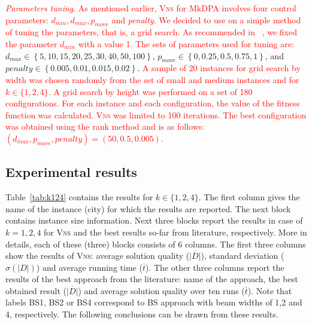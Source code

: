\documentclass[dvipsnames,format=sigconf]{acmart} %
\begin{document}
   \textcolor{red}{\emph{Parameters tuning}. As mentioned earlier, \textsc{Vns} for MkDPA involves four control parameters: $d_{min}, d_{max}, p_{move}$ and \emph{penalty}. We decided to use on a simple method of tuning the parameters, that is, a grid search. As recommended in  ~\cite{mladenovic1997variable}, we fixed the parameter $d_{min}$ with a value 1. The sets of parameters used for tuning are:}
  $d_{max}\in{\left\lbrace 5, 10, 15, 20, 25, 30, 40, 50, 100\right\rbrace }$,  $p_{move}\in{\left\lbrace 0, 0.25, 0.5, 0.75, 1\right\rbrace }$, and $penalty\in{\left\lbrace 0.005, 0.01, 0.015, 0.02\right\rbrace }$. \textcolor{red}{A sample of 20 instances for grid search by width was chosen randomly from the set of small and medium instances and for  $k\in \{1, 2, 4\}$. A grid search by height was performed on a set of 180 configurations. For each instance and each configuration, the value of the fitness function was calculated. \textsc{Vns} was limited to 100 iterations. The best configuration   was obtained using the rank method and is as follows: $(d_{max}, p_{move}, penalty )=(50,0.5, 0.005)$.}

\subsection{Experimental results }
{ \color{red} Table~\ref{tab:k124} contains the results for $k \in \{1, 2,4\}$.  The first column gives the name of the instance (city) for which the results are reported. The next block contains   instance size information. Next three blocks report the results in case of $k=1,2,4$ for \textsc{Vns} and the best results so-far from literature, respectively.  More in details, each of these (three) blocks consists of 6 columns. The first three columns show the results of \textsc{Vns}: average solution quality ($\overline{|D|}$), standard deviation ($\sigma(|D|)$) and average running time ($\overline{t}$).  The other three columns report  the results of the best approach from the literature:   name of the approach,  the best obtained  result ($\overline{|D|}$) and average solution quality over ten runs ($\overline{t}$).  Note that   labels BS1, BS2 or BS4 correspond to BS approach with beam widths of 1,2 and 4, respectively. } The following conclusions can be drawn from these results. 
\end{document}
